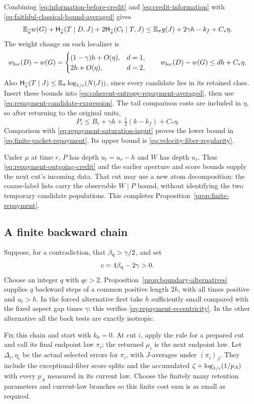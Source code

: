 Combining \eqref{eq:information-before-credit} and
\eqref{eq:credit-information} with
\eqref{eq:faithful-classical-bound-averaged} gives
\[
 \mathbb E_{\widetilde\pi}w(G)+\mathsf H_{\widetilde\pi}(T\mid D,J)
       +2\mathsf H_{\widetilde\pi}(C_t\mid T,J)
 \le \mathbb E_\pi g(J)+2\gamma h-k_f+C_*\eta .
\]
The weight change on each localizer is
\[
 w_{\rm loc}(D)-w(G)=
 \begin{cases}
 (1-\gamma)h+O(\eta),&d=1,\\
 2h+O(\eta),&d=2,
 \end{cases}
 \qquad
 w_{\rm loc}(D)-w(G)\le dh+C_*\eta .
\]
Also \(\mathsf H_{\widetilde\pi}(T\mid J)\le
\mathbb E_\pi\log_{1/\epsilon}\!\left(N(J)\right)\), since every candidate lies in its retained
class.  Insert these bounds into
\eqref{eq:coherent-entropy-repayment-averaged}, then use
\eqref{eq:repayment-candidate-expression}.  The tail comparison
costs are included in \(\eta\), so after returning to the original
units,
\[
 P_t\le B_r+\gamma h+\tfrac12(k-k_f)+C_*\eta .
\]
Comparison with \eqref{eq:repayment-saturation-input} proves the
lower bound in \eqref{eq:finite-packet-repayment}.  Its upper
bound is \eqref{eq:velocity-fiber-regularity}.

Under \(\mu\) at time \(r\), \(P\) has depth \(u_t=u_r-h\)
and \(W\) has depth \(u_r\).  Thus
\eqref{eq:repayment-outgoing-credit} and the earlier aperture and
score bounds supply the next cut's incoming data.  That cut may use
a new atom decomposition: the coarse-label lists carry the observable
\(W\mid P\) bound, without identifying the two temporary candidate
populations.
This completes Proposition~\ref{prop:finite-repayment}.


\subsection{A finite backward chain}

Suppose, for a contradiction, that
\(\beta_{\mathrm q}>\gamma/2\), and set
\[
 c=4\beta_{\mathrm q}-2\gamma>0.
\]
Choose an integer \(q\) with \(qc>2\).
Proposition~\ref{prop:boundary-alternatives} supplies \(q\)
backward steps of a common positive length \(2h\), with
all times positive and \(u_t>h\).
In the forced alternative first take \(h\) sufficiently small
compared with the fixed aspect gap times \(\gamma\);
this verifies \eqref{eq:repayment-eccentricity}.
In the other alternative all the back tests are exactly isotropic.

Fix this chain and start with \(k_0=0\).  At cut \(i\), apply the
rule for a prepared cut and call its final endpoint law \(\pi_i\);
the returned \(\mu_i\) is the next endpoint law.  Let
\(\Delta_i,\eta_i\) be the actual selected errors for \(\pi_i\),
with \(J\)-averages under \((\pi_i)_J\).  They include the exceptional-fiber score splits and
the accumulated \(\zeta+\log_{1/\epsilon}\!\left(1/p_A\right)\) with every \(p_A\)
measured in its current law.  Choose the finitely many retention
parameters and current-law branches so this finite cost sum is
as small as required.

